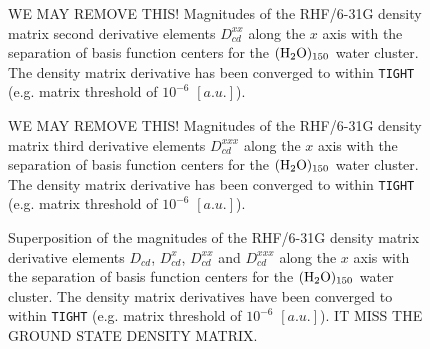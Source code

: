 \documentclass[prl,aps,twocolumn,showpacs,twocolumngrid,superbib]{revtex4}
\begin{document}
\begin{figure}[t]
  \caption{\protect
    WE MAY REMOVE THIS!
    Magnitudes of the RHF/6-31G density matrix second derivative elements $D^{xx}_{cd}$
    along the $x$ axis with the separation of basis function centers
    for the $\rm (H_2O)_{150}$ water cluster. The density matrix 
    derivative has been converged to within {\tt TIGHT} (e.g. 
    matrix threshold of $10^{-6}$ $[a.u.]$).
  }\label{fig:Beta_Decay}
\end{figure}


\begin{figure}[t]
  \caption{\protect
    WE MAY REMOVE THIS!
    Magnitudes of the RHF/6-31G density matrix third derivative elements $D^{xxx}_{cd}$
    along the $x$ axis with the separation of basis function centers
    for the $\rm (H_2O)_{150}$ water cluster. The density matrix 
    derivative has been converged to within {\tt TIGHT} (e.g. 
    matrix threshold of $10^{-6}$ $[a.u.]$).
  }\label{fig:Beta_Decay}
\end{figure}


\begin{figure}[t]
  \caption{\protect
    Superposition of the magnitudes of the RHF/6-31G density matrix
    derivative elements $D_{cd}$, $D^{x}_{cd}$, $D^{xx}_{cd}$ and $D^{xxx}_{cd}$
    along the $x$ axis with the separation of basis function centers
    for the $\rm (H_2O)_{150}$ water cluster. The density matrix 
    derivatives have been converged to within {\tt TIGHT} (e.g. 
    matrix threshold of $10^{-6}$ $[a.u.]$).
    IT MISS THE GROUND STATE DENSITY MATRIX.
  }\label{fig:Superposition_Decay}
\end{figure}
\end{document}
